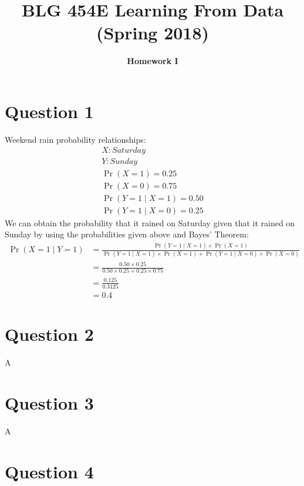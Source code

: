 \documentclass{article}
\DeclareMathOperator{\CondProb}{Pr}
\begin{document}
\title{\bf BLG 454E Learning From Data (Spring 2018)}
\author{\bf Homework I}
\date{}
\maketitle


\section{Question 1}
Weekend rain probability relationships:
\begin{equation*}
\begin{aligned}
	X : Saturday \\
	Y : Sunday \\
	\CondProb{(X = 1)} = 0.25 \\
	\CondProb{(X = 0)} = 0.75 \\
	\CondProb{(Y = 1 \mid X = 1)} = 0.50 \\
	\CondProb{(Y = 1 \mid X = 0)} = 0.25 
\end{aligned}
\end{equation*}
	We can obtain the probability that it rained on Saturday given that it rained on Sunday by using the probabilities given above and Bayes' Theorem:
\begin{equation*}
\begin{split}
	\CondProb{(X = 1 \mid Y = 1)} &=\frac{\CondProb{(Y = 1 \mid X = 1)}\times \CondProb{(X = 1)}}{\CondProb{(Y = 1 \mid X = 1)}\times \CondProb{(X = 1)} + \CondProb{(Y = 1 \mid X = 0)}\times \CondProb{(X = 0)}} \\
	&= \frac{0.50\times 0.25}{0.50\times 0.25 + 0.25\times 0.75} \\
	&= \frac{0.125}{0.3125} \\
	&= \boxed{0.4}
\end{split}
\end{equation*}
\section{Question 2}
A
\section{Question 3}
A
\section{Question 4}
\end{document}
